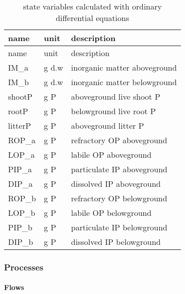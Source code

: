 \documentclass[
]{article}
\begin{document}
\begin{longtable}[]{@{}lll@{}}
\caption{state variables calculated with ordinary differential
equations}\tabularnewline
\toprule
name & unit & description\tabularnewline
\midrule
\endfirsthead
\toprule
name & unit & description\tabularnewline
\midrule
\endhead
IM\_a & g d.w & inorganic matter aboveground\tabularnewline
IM\_b & g d.w & inorganic matter belowground\tabularnewline
shootP & g P & aboveground live shoot P\tabularnewline
rootP & g P & belowground live root P\tabularnewline
litterP & g P & aboveground litter P\tabularnewline
ROP\_a & g P & refractory OP aboveground\tabularnewline
LOP\_a & g P & labile OP aboveground\tabularnewline
PIP\_a & g P & particulate IP aboveground\tabularnewline
DIP\_a & g P & dissolved IP aboveground\tabularnewline
ROP\_b & g P & refractory OP belowground\tabularnewline
LOP\_b & g P & labile OP belowground\tabularnewline
PIP\_b & g P & particulate IP belowground\tabularnewline
DIP\_b & g P & dissolved IP belowground\tabularnewline
\bottomrule
\end{longtable}

\hypertarget{processes}{%
\subsubsection{Processes}\label{processes}}

\hypertarget{flows}{%
\paragraph{Flows}\label{flows}}
\end{document}
